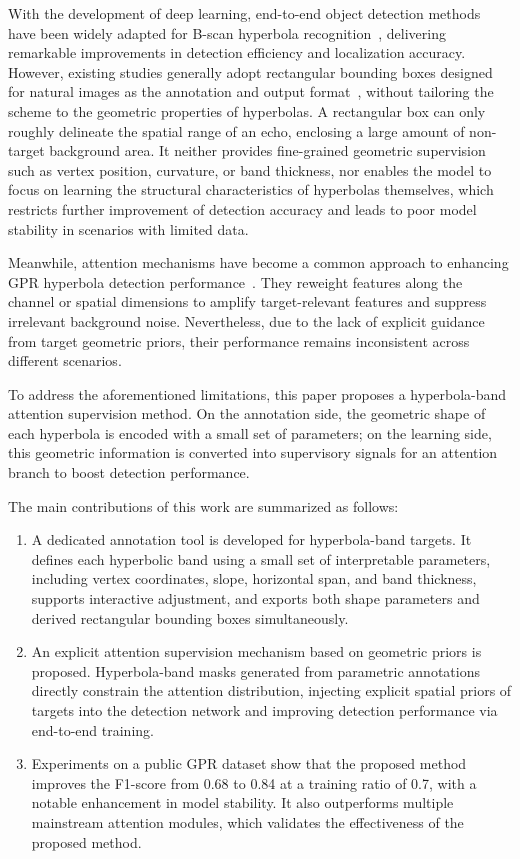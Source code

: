 \documentclass[lettersize,journal]{IEEEtran}
\begin{document}
With the development of deep learning, 
end-to-end object detection methods have been widely adapted for 
B-scan hyperbola recognition~\cite{besaw2015deep,redmon2016yolo,redmon2018yolov3,bochkovskiy2020yolov4}, 
delivering remarkable improvements in detection efficiency and localization accuracy. 
However, existing studies generally adopt rectangular bounding boxes designed for natural images as the annotation and output format~\cite{redmon2016yolo}, 
without tailoring the scheme to the geometric properties of hyperbolas. 
A rectangular box can only roughly delineate the spatial range of an echo, 
enclosing a large amount of non-target background area. 
It neither provides fine-grained geometric supervision such as vertex position, curvature, or band thickness, 
nor enables the model to focus on learning the structural characteristics of hyperbolas themselves, 
which restricts further improvement of detection accuracy and leads to poor model stability in scenarios with limited data.

Meanwhile, attention mechanisms have become a common approach to enhancing GPR hyperbola detection performance~\cite{hu2018senet,woo2018cbam,wang2020eca,hou2021coordinate,vaswani2017attention,wang2018nonlocal}. 
They reweight features along the channel or spatial dimensions to amplify target-relevant features and suppress irrelevant background noise. 
Nevertheless, due to the lack of explicit guidance from target geometric priors, 
their performance remains inconsistent across different scenarios.

To address the aforementioned limitations, this paper proposes a hyperbola-band attention supervision method. 
On the annotation side, the geometric shape of each hyperbola is encoded with a small set of parameters; 
on the learning side, this geometric information is converted into supervisory signals for an attention branch 
to boost detection performance. 

The main contributions of this work are summarized as follows:

\begin{enumerate}
\item A dedicated annotation tool is developed for hyperbola-band targets. 
It defines each hyperbolic band using a small set of interpretable parameters, 
including vertex coordinates, slope, horizontal span, and band thickness, 
supports interactive adjustment, and exports both shape parameters and derived rectangular bounding boxes simultaneously.
\item An explicit attention supervision mechanism based on geometric priors is proposed. 
Hyperbola-band masks generated from parametric annotations directly constrain the attention distribution, 
injecting explicit spatial priors of targets into the detection network and improving detection performance via end-to-end training.
\item Experiments on a public GPR dataset show that the proposed method improves the F1-score from 0.68 to 0.84 at a training ratio of 0.7, 
with a notable enhancement in model stability. It also outperforms multiple mainstream attention modules, 
which validates the effectiveness of the proposed method.
\end{enumerate}
\end{document}
